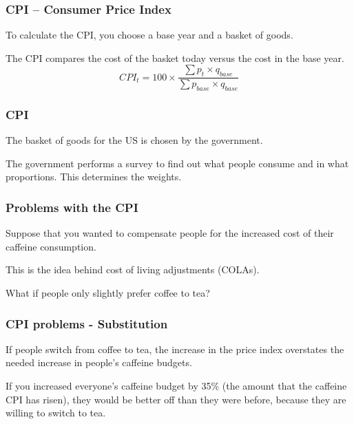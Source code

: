 \documentclass[aspectratio=169]{beamer}
\newenvironment{wideitemize}{\itemize\addtolength{\itemsep}{10pt}}{\enditemize}
\begin{document}
\begin{frame}
\frametitle{CPI -- Consumer Price Index}
\begin{wideitemize}
\item To calculate the CPI, you choose a base year and a basket of goods.
\item The CPI compares the cost of the basket today versus the cost in the base year.
\end{wideitemize}
\begin{equation*}
CPI_t = 100 \times\frac{\sum p_t \times q_{base}}{\sum p_{base} \times q_{base}}
\end{equation*}
\end{frame}


\begin{frame}
\frametitle{CPI}
\begin{wideitemize}
\item The basket of goods for the US is chosen by the government.
\item The government performs a survey to find out what people consume and in what proportions.  This determines the weights.
\end{wideitemize}
\end{frame}


\begin{frame}
\frametitle{Problems with the CPI}
\begin{wideitemize}
\item Suppose that you wanted to compensate people for the increased cost of their caffeine consumption.
\begin{wideitemize}
\item This is the idea behind cost of living adjustments (COLAs).
\end{wideitemize}
\item What if people only slightly prefer coffee to tea?
\end{wideitemize}
\end{frame}


\begin{frame}
\frametitle{CPI problems - Substitution}
\begin{wideitemize}
\item If people switch from coffee to tea, the increase in the price index overstates the needed increase in people's caffeine budgets.
\item If you increased everyone's caffeine budget by 35\% (the amount that the caffeine CPI has risen), they would be better off than they were before, because they are willing to switch to tea.
\end{wideitemize}
\end{frame}
\end{document}
